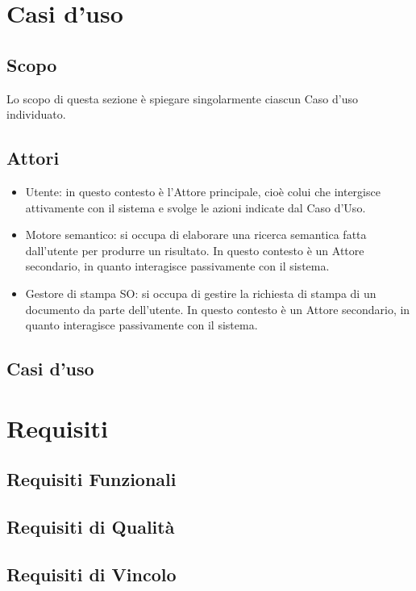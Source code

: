 \documentclass[a4paper,12pt]{article}
\begin{document}
    \section{Casi d'uso} {
        \subsection{Scopo} {
            Lo scopo di questa sezione è spiegare singolarmente ciascun Caso d'uso individuato.  
        }
        \subsection{Attori} {
            \begin{itemize}
                \item Utente: in questo contesto è l'Attore principale, cioè colui che intergisce attivamente con il sistema e svolge le azioni indicate dal Caso d'Uso.
                \item Motore semantico: si occupa di elaborare una ricerca semantica fatta dall'utente per produrre un risultato. In questo contesto è un Attore secondario, in quanto interagisce passivamente con il sistema.
                \item Gestore di stampa SO: si occupa di gestire la richiesta di stampa di un documento da parte dell'utente. In questo contesto è un Attore secondario, in quanto interagisce passivamente con il sistema.
            \end{itemize}
        }
        \subsection{Casi d'uso} {

        }
    }
    \newpage
    \section{Requisiti} {
       
        \subsection{Requisiti Funzionali} {
            
        }
        \subsection{Requisiti di Qualità} {
           
        }
        \subsection{Requisiti di Vincolo} {
           
        }
    }
\end{document}
